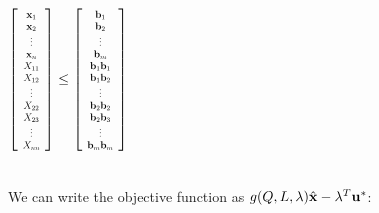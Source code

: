$\large{\left[
	\scalebox{0.6}{%
		\begin{tabular}{ c }
		$\vx_1$ \\ 
		$\vx_2$ \\  
		$\vdots$ \\
		$\vx_n$ \\
		$X_{11}$ \\ 
		$X_{12}$  \\
		$\vdots$ \\
		$X_{22}$\\
		$X_{23}$\\
		$\vdots$ \\
		$X_{nn}$ 
		\end{tabular}%
	} 
	\right]\leq \left[
	\scalebox{0.6}{%
		\begin{tabular}{ c }
		$\vb_1$ \\ 
		$\vb_2$ \\  
		$\vdots$ \\
		$\vb_m$ \\
		$\vb_1\vb_1$ \\ 
		$\vb_1\vb_2$  \\
		$\vdots$ \\
		$\vb_2\vb_2$\\
		$\vb_2\vb_3$\\
		$\vdots$ \\
		$\vb_m\vb_m$ 
		\end{tabular}%
	} 
	\right]}$

\ \\
We can write the objective function as $g(Q,L,\lambda)\hat{\mathbf{x}}-\lambda^T\mathbf{u}^*$:\\

